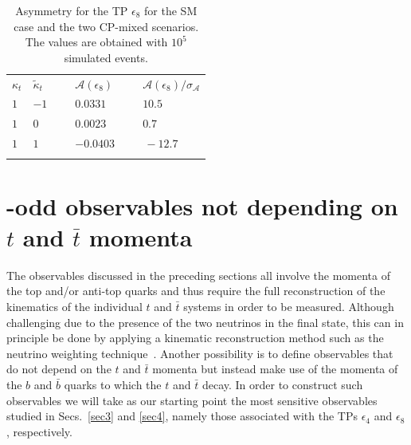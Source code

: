 \documentclass[aps,preprint,tightenlines,floatfix,superscriptaddress,nofootinbib,showpacs]{revtex4-1}
\def\tbar{\bar{t}}
\def\bbar{\bar{b}}
\begin{document}
\begin{table}[H]
\caption{Asymmetry for the TP $\epsilon_{8}$ for the SM case and the
  two $\mathrm{CP}$-mixed scenarios. The
  values are obtained with $10^5$ simulated events.}
\label{table8}
\begin{center}
\begin{tabular}{|C{1cm}|C{1cm}||C{2cm}|C{2cm}|}
\hhline{|====|}
$\kappa_t$&$\tilde{\kappa}_t$~~&$\mathcal{A}(\epsilon_8)$~~&$\mathcal{A}(\epsilon_8)/\sigma_{\mathcal{A}}$ \\ 
\hhline{|====|} 
$1$ & $-1$~~~ & $0.0331$~ & $10.5$~ \\[0.6mm]
\hline
$1$ & $0$ & $0.0023$~ & $0.7$~ \\[0.6mm]
\hline
$1$ & $1$ & $-0.0403$~~~ & $\,-12.7$~~~~ \\[0.6mm]
\hhline{|====|}
\end{tabular}
\end{center} 
\end{table}
\section{{}-odd observables not depending on \MakeLowercase{{\boldmath $t$}} and \MakeLowercase{{\boldmath $\tbar$}} momenta}
\label{sec5}
The observables discussed in the preceding sections all involve the
momenta of the top and/or anti-top quarks and thus require the full
reconstruction of the kinematics of the individual $t$ and $\tbar$
systems in order to be measured. Although challenging due to the
presence of the two neutrinos in the final state, this can in principle be
done by applying a kinematic reconstruction method such as the
neutrino weighting technique~\cite{atlasconf,atlascharge}. Another
possibility is to define observables that do not depend on the $t$
and $\tbar$ momenta but instead make use of the momenta of the
$b$ and $\bbar$ quarks to which the $t$ and $\tbar$ decay. In
order to construct such observables we will take as our starting
point the most
sensitive observables studied in Secs.~\ref{sec3} and \ref{sec4},
namely those associated with the TPs $\epsilon_4$ and $\epsilon_8$,
respectively.
\end{document}
